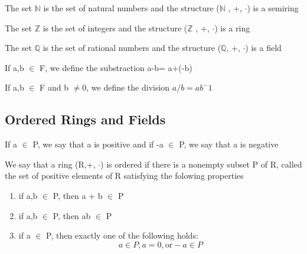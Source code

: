 \documentclass{article}
\begin{document}
\begin{lemma}
    The set $ \mathbb{N} $ is the set of natural numbers and the structure
    ($ \mathbb{N} $ , +, $\cdot $) is a semiring
\end{lemma}

\begin{lemma}
    The set $ \mathbb{Z} $ is the set of integers and the structure
    ($ \mathbb{Z} $ , +, $\cdot $) is a ring
\end{lemma}

\begin{lemma}
    The set $ \mathbb{Q} $ is the set of rational numbers and the structure
    ($ \mathbb{Q} $, +, $\cdot $) is a field
\end{lemma}

\begin{definition}[Substraction]
    If a,b $ \in $ F, we define the substraction a-b= a+(-b)
\end{definition}

\begin{definition}[Division]
    If a,b $ \in $ F and b $\neq$0, we define the division $a/b= ab^-1$
\end{definition}

\subsection{Ordered Rings and Fields}

\begin{definition}
    If a $\in$ P, we say that a is positive and if -a $\in$ P, we say that a is
    negative
\end{definition}

\begin{definition}
    We say that a ring (R,+, $\cdot$) is ordered if there is a nonempty subset
    P of R, called the set of positive elements of R satisfying the folowing
    properties
    \begin{enumerate}
	\item if a,b $\in$ P, then a + b $\in$ P
	\item if a,b $\in$ P, then ab $\in$ P
	\item if a $\in$ P, then exactly one of the following holds:
	    $$ a \in P, a=0, \text{or} -a \in P $$
    \end{enumerate}
\end{definition}
\end{document}
